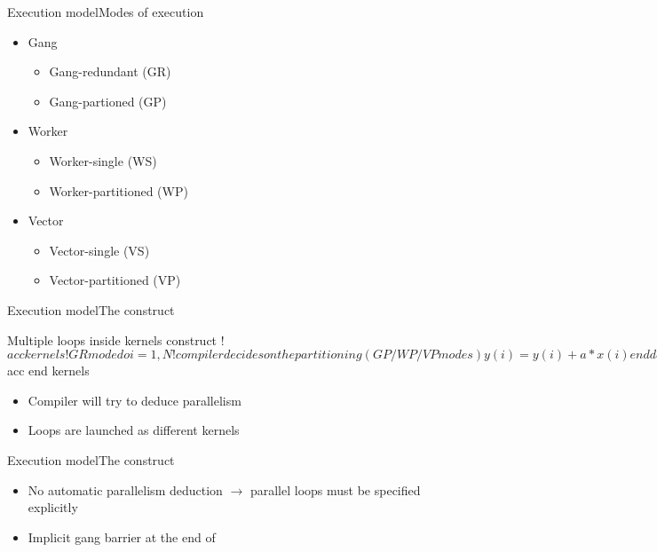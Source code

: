 \documentclass[12pt,aspectratio=169]{beamer}
\begin{document}
\begin{frame}{Execution model}{Modes of execution}
  \begin{itemize}
  \item Gang
    \begin{itemize}
    \item Gang-redundant (GR)
    \item Gang-partioned (GP)
    \end{itemize}
  \item Worker
    \begin{itemize}
    \item Worker-single (WS)
    \item Worker-partitioned (WP)
    \end{itemize}
  \item Vector
    \begin{itemize}
    \item Vector-single (VS)
    \item Vector-partitioned (VP)
    \end{itemize}
  \end{itemize}
\end{frame}

\begin{frame}[fragile]{Execution model}{The  construct}
  \begin{Fortranlisting}{Multiple loops inside kernels construct}
!$acc kernels
    !GR mode
    do i = 1, N
        !compiler decides on the partitioning (GP/WP/VP modes)
        y(i) = y(i) + a*x(i)
    enddo
    do i = 1, N
        !compiler decides on the partitioning (GP/WP/VP modes)
        y(i) = b*y(i) + a*x(i)
    enddo
!$acc end kernels
  \end{Fortranlisting}
  \begin{itemize}
  \item Compiler will try to deduce parallelism
  \item Loops are launched as different kernels
  \end{itemize}
\end{frame}

\begin{frame}[fragile]{Execution model}{The  construct}
  \begin{itemize}
  \item No automatic parallelism deduction $\rightarrow$ parallel loops must
    be specified explicitly
  \item Implicit gang barrier at the end of 
  \end{itemize}
\end{frame}
\end{document}
